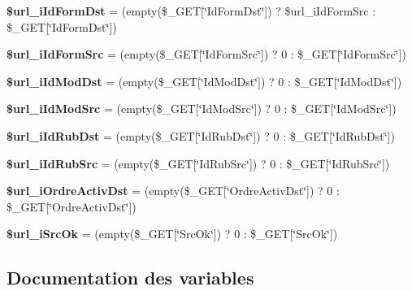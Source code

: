 \begin{CompactItemize}
\item 
\textbf{\$url\_\-iIdFormDst} = (empty(\$\_\-GET[\char`\"{}IdFormDst\char`\"{}]) ? \$url\_\-iIdFormSrc : \$\_\-GET[\char`\"{}IdFormDst\char`\"{}])\label{copie__activ_8php_567046dac06231cd778843179645aac5}

\item 
\textbf{\$url\_\-iIdFormSrc} = (empty(\$\_\-GET[\char`\"{}IdFormSrc\char`\"{}]) ? 0 : \$\_\-GET[\char`\"{}IdFormSrc\char`\"{}])\label{copie__activ_8php_7d23b6d8e8be4b72aec972efac946e63}

\item 
\textbf{\$url\_\-iIdModDst} = (empty(\$\_\-GET[\char`\"{}IdModDst\char`\"{}]) ? 0 : \$\_\-GET[\char`\"{}IdModDst\char`\"{}])\label{copie__activ_8php_c41023b63574a7d174a663b4d124b1bc}

\item 
\textbf{\$url\_\-iIdModSrc} = (empty(\$\_\-GET[\char`\"{}IdModSrc\char`\"{}]) ? 0 : \$\_\-GET[\char`\"{}IdModSrc\char`\"{}])\label{copie__activ_8php_404de3ff18f4725fee13ab25d228dfd4}

\item 
\textbf{\$url\_\-iIdRubDst} = (empty(\$\_\-GET[\char`\"{}IdRubDst\char`\"{}]) ? 0 : \$\_\-GET[\char`\"{}IdRubDst\char`\"{}])\label{copie__activ_8php_d38b2dba1867600ceebb02443bbd894d}

\item 
\textbf{\$url\_\-iIdRubSrc} = (empty(\$\_\-GET[\char`\"{}IdRubSrc\char`\"{}]) ? 0 : \$\_\-GET[\char`\"{}IdRubSrc\char`\"{}])\label{copie__activ_8php_6f4b968c61928c1ec368acd93e89f7ef}

\item 
\textbf{\$url\_\-iOrdreActivDst} = (empty(\$\_\-GET[\char`\"{}OrdreActivDst\char`\"{}]) ? 0 : \$\_\-GET[\char`\"{}OrdreActivDst\char`\"{}])\label{copie__activ_8php_187e7840354d340879894d86c493d1e2}

\item 
\textbf{\$url\_\-iSrcOk} = (empty(\$\_\-GET[\char`\"{}SrcOk\char`\"{}]) ? 0 : \$\_\-GET[\char`\"{}SrcOk\char`\"{}])\label{copie__activ_8php_b57149b16534096f0ca81cd8e78fa958}

\end{CompactItemize}


\subsection{Documentation des variables}
